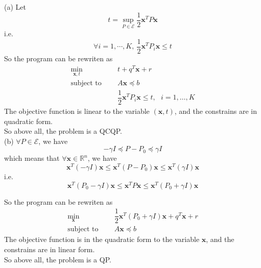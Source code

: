 (a) Let $$t=\sup\limits_{P\in\mathcal{E}}\dfrac{1}{2}\mathbf{x}^TP\mathbf{x}$$
i.e. $$\forall i=1,\cdots,K,\ \dfrac{1}{2}\mathbf{x}^TP_i\mathbf{x}\leq t$$
So the program can be rewriten as
\begin{align*}
    \min_{\mathbf{x},t}\ \ \ \ \ & t+q^T \mathbf{x}+r \\
    \text {subject to }\ \ \ \ \ & A \mathbf{x} \preceq b\\
    & \dfrac{1}{2}\mathbf{x}^TP_i\mathbf{x}\leq t,\ \ \ i=1, \ldots, K
\end{align*}
The objective function is linear to the variable $(\mathbf{x},t)$, and the constrains are in quadratic form.\\
So above all, the problem is a QCQP.\\

(b) $\forall P\in\mathcal{E}$, we have
$$-\gamma I \preceq P-P_0 \preceq \gamma I$$
which means that $\forall\mathbf{x}\in\mathbb{R}^n$, we have
$$\mathbf{x}^T (-\gamma I) \mathbf{x}\leq \mathbf{x}^T(P-P_0)\mathbf{x} \leq  \mathbf{x}^T(\gamma I)\mathbf{x}$$
i.e.
$$\mathbf{x}^T (P_0-\gamma I) \mathbf{x}\leq \mathbf{x}^TP\mathbf{x} \leq \mathbf{x}^T(P_0+\gamma I)\mathbf{x}$$

So the program can be rewriten as
\begin{align*}
    \min_{\mathbf{x}}\ \ \ \ \ & \dfrac{1}{2}\mathbf{x}^T(P_0+\gamma I)\mathbf{x}+q^T \mathbf{x}+r \\
    \text {subject to }\ \ \ \ \ & A \mathbf{x} \preceq b
\end{align*}
The objective function is in the quadratic form to the variable $\mathbf{x}$, and the constrains are in linear form.\\
So above all, the problem is a QP.\\

